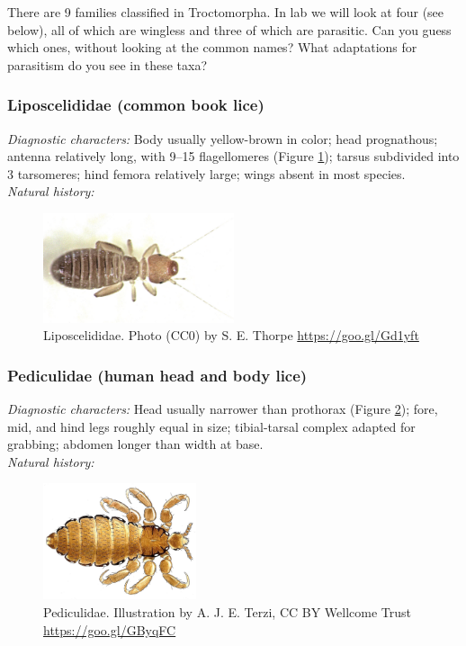 \documentclass[letterpaper, 11pt]{article}
\begin{document}
\noindent{}There are 9 families classified in Troctomorpha. In lab we will look at four (see below), all of which are wingless and three of which are parasitic. Can you guess which ones, without looking at the common names? What adaptations for parasitism do you see in these taxa?\vspace{4cm}

\subsubsection{Liposcelididae (common book lice)}
\noindent{}\textit{Diagnostic characters:} Body usually yellow-brown in color; head prognathous; antenna relatively long, with 9--15 flagellomeres (Figure \ref{fig:liposcelidid}); tarsus subdivided into 3 tarsomeres; hind femora relatively large; wings absent in most species.\\

\noindent{}\textit{Natural history:} \\

\begin{figure}[ht!]
 \centering
 \includegraphics[width=0.5\textwidth]{LiposcelididHabitus}
 \caption{Liposcelididae. Photo (CC0) by S. E. Thorpe \url{https://goo.gl/Gd1yft}}
 \label{fig:liposcelidid}
\end{figure}

\subsubsection{Pediculidae (human head and body lice)}
\noindent{}\textit{Diagnostic characters:} Head usually narrower than prothorax (Figure \ref{fig:pediculid}); fore, mid, and hind legs roughly equal in size; tibial-tarsal complex adapted for grabbing; abdomen longer than width at base.\\

\noindent{}\textit{Natural history:} \\

\begin{figure}[ht!]
 \centering
 \includegraphics[width=0.4\textwidth]{PediculidHabitus}
 \caption{Pediculidae. Illustration by A. J. E. Terzi, CC BY Wellcome Trust \url{https://goo.gl/GByqFC}}
 \label{fig:pediculid}
\end{figure}
\end{document}
